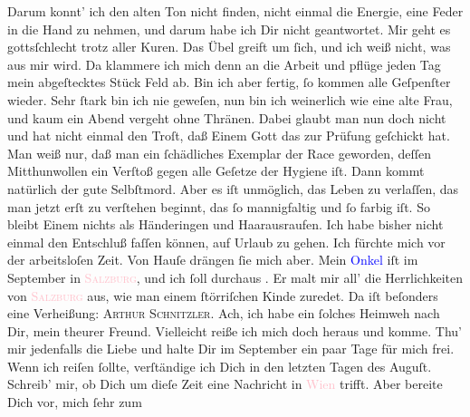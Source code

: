                Darum konnt’ ich den alten Ton nicht finden, nicht einmal die Energie, eine Feder in
               die Hand zu nehmen, und darum habe ich Dir nicht geantwortet. Mir geht es
               gottsſchlecht trotz aller Kuren. Das Übel greift um ſich, und ich weiß nicht, was aus
               mir wird. Da klammere ich mich denn an die Arbeit und pflüge jeden Tag mein
               abgeſtecktes Stück Feld ab. Bin ich aber fertig, ſo kommen alle Geſpenſter {\pb}wieder. Sehr ſtark bin ich nie geweſen, nun bin ich
               weinerlich wie eine alte Frau, und kaum ein Abend vergeht ohne Thränen. Dabei glaubt
               man nun doch nicht und hat nicht einmal den Troſt, daß Einem Gott das zur Prüfung
               geſchickt hat. Man weiß nur, daß man ein ſchädliches Exemplar der Race geworden,
               deſſen Mitthunwollen ein Verſtoß gegen alle Geſetze der Hygiene iſt. Dann kommt
               natürlich der gute Selbſtmord. Aber es iſt unmöglich, das Leben zu verlaſſen, das man
               jetzt erſt zu verſtehen beginnt, das ſo mannigfaltig und ſo farbig iſt. So bleibt
               Einem nichts als Händeringen und Haarausraufen.\pend
           \pstart
           Ich habe bisher nicht einmal den Entschluß faſſen können, auf Urlaub zu gehen. {\pb}Ich fürchte mich vor der arbeitsloſen Zeit. Von
               Hauſe drängen ſie mich aber. Mein \textcolor{blue}{Onkel}{} iſt im September in \textsc{\textcolor{pink}{Salzburg}{}\ledrightnote{\textcolor{pink}{Salzburg}}}, und ich ſoll durchaus \label{K_L02711-2v}\label{K_L02711-2h}. Er malt mir all’ die Herrlichkeiten von \textcolor{pink}{\textsc{Salzburg}}{}\ledrightnote{\textcolor{pink}{Salzburg}} aus, wie man einem ſtörriſchen Kinde zuredet. Da iſt beſonders eine Verheißung:
                  \textsc{Arthur Schnitzler}. Ach, ich habe ein ſolches Heimweh
               nach Dir, mein theurer Freund. Vielleicht reiße ich mich doch heraus und komme. Thu’
               mir jedenfalls die Liebe und halte Dir im September ein
               paar Tage für mich frei. Wenn ich reiſen ſollte, verſtändige ich Dich {\pb}in den letzten Tagen des Auguſt. Schreib’ mir, ob Dich um dieſe Zeit eine Nachricht in \textcolor{pink}{Wien}{}\ledrightnote{\textcolor{pink}{Wien}} trifft. Aber bereite Dich vor, mich ſehr zum
